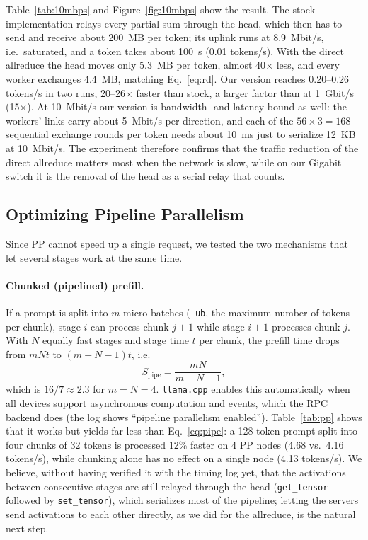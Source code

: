 \documentclass[11pt,a4paper]{article}
\begin{document}
Table~\ref{tab:10mbps} and Figure~\ref{fig:10mbps} show the result. The stock implementation relays every partial sum through the head, which then has to send and receive about 200~MB per token; its uplink runs at 8.9~Mbit/s, i.e.\ saturated, and a token takes about 100~s (0.01 tokens/s). With the direct allreduce the head moves only 5.3~MB per token, almost 40$\times$ less, and every worker exchanges 4.4~MB, matching Eq.~\ref{eq:rd}. Our version reaches 0.20--0.26 tokens/s in two runs, 20--26$\times$ faster than stock, a larger factor than at 1~Gbit/s (15$\times$). At 10~Mbit/s our version is bandwidth- and latency-bound as well: the workers' links carry about 5~Mbit/s per direction, and each of the $56 \times 3 = 168$ sequential exchange rounds per token needs about 10~ms just to serialize 12~KB at 10~Mbit/s. The experiment therefore confirms that the traffic reduction of the direct allreduce matters most when the network is slow, while on our Gigabit switch it is the removal of the head as a serial relay that counts.

\subsection{Optimizing Pipeline Parallelism}\label{sec:n8_9}

Since PP cannot speed up a single request, we tested the two mechanisms that let several stages work at the same time.

\paragraph{Chunked (pipelined) prefill.} If a prompt is split into $m$ micro-batches (\texttt{-ub}, the maximum number of tokens per chunk), stage $i$ can process chunk $j+1$ while stage $i+1$ processes chunk $j$. With $N$ equally fast stages and stage time $t$ per chunk, the prefill time drops from $mNt$ to $(m+N-1)t$, i.e.
\begin{equation}
S_{\text{pipe}} = \frac{mN}{m+N-1},
\label{eq:pipe}
\end{equation}
which is $16/7 \approx 2.3$ for $m=N=4$. \texttt{llama.cpp} enables this automatically when all devices support asynchronous computation and events, which the RPC backend does (the log shows ``pipeline parallelism enabled''). Table~\ref{tab:pp} shows that it works but yields far less than Eq.~\ref{eq:pipe}: a 128-token prompt split into four chunks of 32 tokens is processed 12\% faster on 4 PP nodes (4.68 vs.\ 4.16 tokens/s), while chunking alone has no effect on a single node (4.13 tokens/s). We believe, without having verified it with the timing log yet, that the activations between consecutive stages are still relayed through the head (\texttt{get\_tensor} followed by \texttt{set\_tensor}), which serializes most of the pipeline; letting the servers send activations to each other directly, as we did for the allreduce, is the natural next step.
\end{document}
